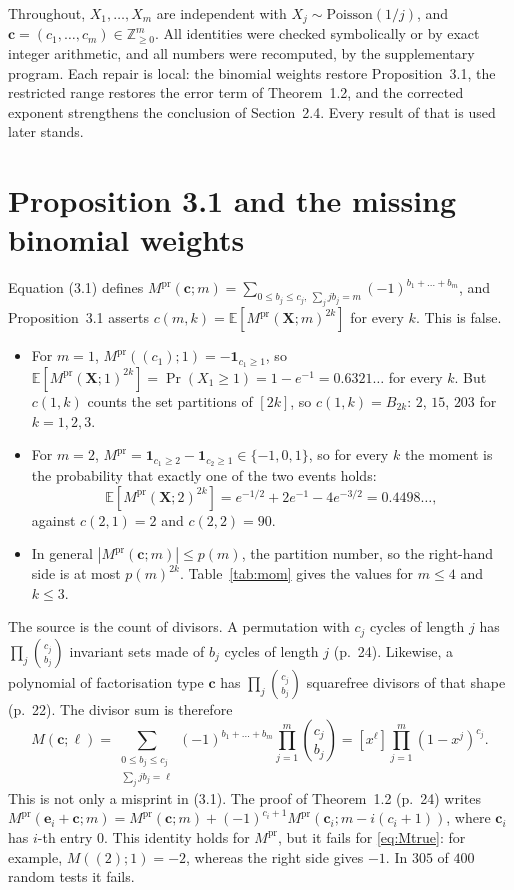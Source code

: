 \documentclass[11pt,a4paper]{amsart}
\theoremstyle{remark}
\newcommand{\bc}{\mathbf c}
\newcommand{\bX}{\mathbf X}
\newcommand{\E}{\mathbb E}
\newcommand{\Mp}{M^{\mathrm{pr}}}
\begin{document}
Throughout, $X_1,\dots,X_m$ are independent with $X_j\sim\mathrm{Poisson}(1/j)$, and
$\bc=(c_1,\dots,c_m)\in\mathbb Z_{\ge0}^m$. All identities were checked symbolically or by exact integer
arithmetic, and all numbers were recomputed, by the supplementary program. Each repair
is local: the binomial weights restore Proposition~3.1, the restricted range restores the error term of
Theorem~1.2, and the corrected exponent strengthens the conclusion of Section~2.4. Every result of
\cite{GKM} that is used later stands.

\section{Proposition 3.1 and the missing binomial weights}\label{sec:prop31}

Equation (3.1) defines
$\Mp(\bc;m)=\sum_{0\le b_j\le c_j,\ \sum_j jb_j=m}(-1)^{b_1+\dots+b_m}$, and Proposition~3.1 asserts
$c(m,k)=\E[\Mp(\bX;m)^{2k}]$ for every $k$. This is false.
\begin{itemize}
\item For $m=1$, $\Mp((c_1);1)=-\mathbf 1_{c_1\ge1}$, so $\E[\Mp(\bX;1)^{2k}]=\Pr(X_1\ge1)=1-e^{-1}=0.6321\ldots$
for every $k$. But $c(1,k)$ counts the set partitions of $[2k]$, so $c(1,k)=B_{2k}$: $2$, $15$, $203$ for
$k=1,2,3$.
\item For $m=2$, $\Mp=\mathbf 1_{c_1\ge2}-\mathbf 1_{c_2\ge1}\in\{-1,0,1\}$, so for every $k$ the
moment is the probability that exactly one of the two events holds:
\[
\E[\Mp(\bX;2)^{2k}]=e^{-1/2}+2e^{-1}-4e^{-3/2}=0.4498\ldots,
\]
against $c(2,1)=2$ and $c(2,2)=90$.
\item In general $|\Mp(\bc;m)|\le p(m)$, the partition number, so the right-hand side is at most
$p(m)^{2k}$. Table~\ref{tab:mom} gives the values for $m\le4$ and $k\le3$.
\end{itemize}

The source is the count of divisors. A permutation with $c_j$ cycles of length $j$ has
$\prod_j\binom{c_j}{b_j}$ invariant sets made of $b_j$ cycles of length $j$ (p.~24). Likewise, a polynomial
of factorisation type $\bc$ has $\prod_j\binom{c_j}{b_j}$ squarefree divisors of that shape (p.~22). The
divisor sum is therefore
\begin{equation}\label{eq:Mtrue}
M(\bc;\ell)=\sum_{\substack{0\le b_j\le c_j\\ \sum_j jb_j=\ell}}(-1)^{b_1+\dots+b_m}\prod_{j=1}^m\binom{c_j}{b_j}
=[x^\ell]\prod_{j=1}^m(1-x^j)^{c_j}.
\end{equation}
This is not only a misprint in (3.1). The proof of Theorem~1.2 (p.~24) writes
$\Mp(\mathbf e_i+\bc;m)=\Mp(\bc;m)+(-1)^{c_i+1}\Mp(\bc_i;m-i(c_i+1))$, where $\bc_i$ has $i$-th entry $0$.
This identity holds for $\Mp$, but it fails for \eqref{eq:Mtrue}: for example, $M((2);1)=-2$, whereas the
right side gives $-1$. In $305$ of $400$ random tests it fails.
\end{document}
